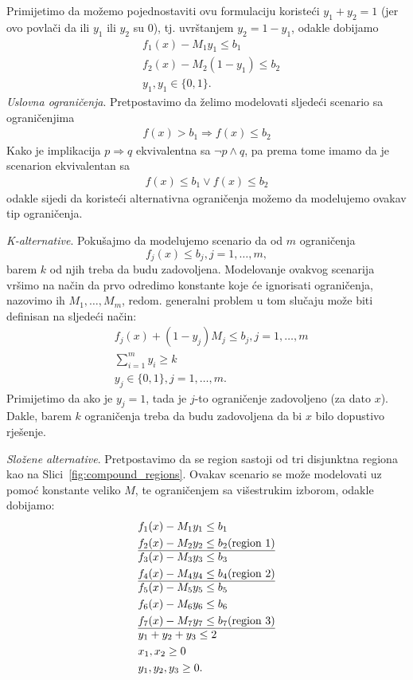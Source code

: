 \documentclass[a4paper, utf8, 11pt, colorlinks]{article}
\begin{document}
Primijetimo da možemo  pojednostaviti ovu formulaciju koristeći $y_1 + y_2 = 1$ (jer ovo povlači da ili $y_1$ ili $y_2$ su 0), tj. uvrštanjem $y_2 =  1-y_1$, odakle dobijamo 
\begin{align*}
      & f_1(x) - M_1 y_1       \leq b_1 \\
      & f_2(x) - M_2 (1-y_1)   \leq b_2  \\
      & y_1, y_1 \in \{0,1 \}.
\end{align*}
\emph{Uslovna ograničenja}. 
Pretpostavimo da želimo modelovati sljedeći scenario sa ograničenjima 
\begin{align*}
    f(x) > b_1 \Rightarrow f(x) \leq b_2 
\end{align*}
Kako je implikacija $p \Rightarrow q$ ekvivalentna sa $\neg p \wedge q$, pa prema tome imamo da je scenarion ekvivalentan sa
\begin{align*}
    f(x) \leq b_1 \vee f(x) \leq b_2 
\end{align*}
odakle sijedi da koristeći alternativna ograničenja možemo da modelujemo ovakav tip ograničenja.

\emph{K-alternative}. Pokušajmo da modelujemo scenario da od $m$ ograničenja
$$f_j(x) \leq  b_j, j=1,\ldots,m,$$
barem $k$ od njih treba da budu zadovoljena. Modelovanje ovakvog scenarija vršimo na način da prvo odredimo konstante koje će ignorisati ograničenja, nazovimo ih $M_1, \ldots, M_m$, redom. generalni problem u tom slučaju može biti definisan na sljedeći način:
\begin{align}
     &f_j(x) + (1-y_j) M_j \leq b_j, j=1,\ldots,m\\
     & \sum_{i=1}^m y_i \geq k \\
     & y_j \in \{0,1\}, j=1,\ldots,m.
\end{align}
Primijetimo da ako je $y_j = 1$, tada je $j$-to ograničenje zadovoljeno (za dato $x$). Dakle, barem $k$ ograničenja treba da budu zadovoljena da bi $x$ bilo dopustivo rješenje. 

\emph{Složene alternative}. Pretpostavimo da se region sastoji od tri disjunktna regiona kao na Slici~\ref{fig:compound_regions}. Ovakav scenario se može modelovati uz pomoć konstante veliko $M$, te  ograničenjem sa višestrukim izborom, odakle dobijamo:
\begin{align*}
    &f_1(x) - M_1 y_1 \leq b_1 \\
    &f_2(x) - M_2 y_2 \leq b_2 (\mbox{region 1}) \\ \hline
    & f_3(x) - M_3 y_3 \leq b_3 \\ 
    & f_4(x) - M_4 y_4 \leq b_4 (\mbox{region 2})\\  \hline 
    & f_5(x) - M_5 y_5 \leq b_5 \\
    & f_6(x) - M_6 y_6 \leq b_6 \\
    & f_7(x) - M_7 y_7 \leq b_7 (\mbox{region 3}) \\ \hline
    & y_1 + y_2 + y_3 \leq 2 \\
    & x_1, x_2 \geq 0 \\
    & y_1, y_2, y_3 \geq 0.
\end{align*}
\end{document}
